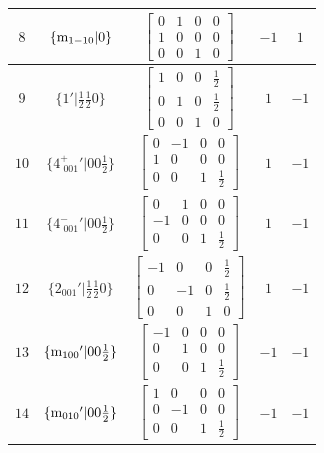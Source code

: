 \documentclass[fleqn,8pt]{jsarticle}
\begin{document}
\begin{longtable}{ccccc}
$ 8 $ & $ \{{\rm m}_{1-10}|0\} $ & $ \begin{bmatrix} 0 & 1 & 0 & 0 \\ 1 & 0 & 0 & 0 \\ 0 & 0 & 1 & 0 \end{bmatrix} $ & $ -1 $ & $ 1 $ \\ \hline
$ 9 $ & $ \{1{}'|\frac{1}{2} \frac{1}{2} 0\} $ & $ \begin{bmatrix} 1 & 0 & 0 & \frac{1}{2} \\ 0 & 1 & 0 & \frac{1}{2} \\ 0 & 0 & 1 & 0 \end{bmatrix} $ & $ 1 $ & $ -1 $ \\ \hline
$ 10 $ & $ \{4^{+}_{\,\,001}{}'|0 0 \frac{1}{2}\} $ & $ \begin{bmatrix} 0 & -1 & 0 & 0 \\ 1 & 0 & 0 & 0 \\ 0 & 0 & 1 & \frac{1}{2} \end{bmatrix} $ & $ 1 $ & $ -1 $ \\ \hline
$ 11 $ & $ \{4^{-}_{\,\,001}{}'|0 0 \frac{1}{2}\} $ & $ \begin{bmatrix} 0 & 1 & 0 & 0 \\ -1 & 0 & 0 & 0 \\ 0 & 0 & 1 & \frac{1}{2} \end{bmatrix} $ & $ 1 $ & $ -1 $ \\ \hline
$ 12 $ & $ \{2{}_{001}{}'|\frac{1}{2} \frac{1}{2} 0\} $ & $ \begin{bmatrix} -1 & 0 & 0 & \frac{1}{2} \\ 0 & -1 & 0 & \frac{1}{2} \\ 0 & 0 & 1 & 0 \end{bmatrix} $ & $ 1 $ & $ -1 $ \\ \hline
$ 13 $ & $ \{{\rm m}_{100}{}'|0 0 \frac{1}{2}\} $ & $ \begin{bmatrix} -1 & 0 & 0 & 0 \\ 0 & 1 & 0 & 0 \\ 0 & 0 & 1 & \frac{1}{2} \end{bmatrix} $ & $ -1 $ & $ -1 $ \\ \hline
$ 14 $ & $ \{{\rm m}_{010}{}'|0 0 \frac{1}{2}\} $ & $ \begin{bmatrix} 1 & 0 & 0 & 0 \\ 0 & -1 & 0 & 0 \\ 0 & 0 & 1 & \frac{1}{2} \end{bmatrix} $ & $ -1 $ & $ -1 $ \\ \hline

\end{longtable}
\end{document}
